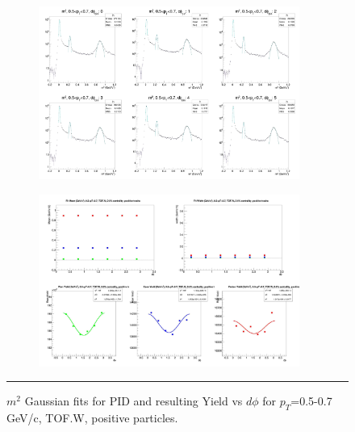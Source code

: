 \begin{figure}[H]
  \centering
    \begin{subfigure}[p]{1\textwidth}
   \centering
   \includegraphics[width=0.94\textwidth]{lowptfits/yieldvsdphi_tof1_cent0_ch1_pT-5-7.jpg}
    \end{subfigure}
    \begin{subfigure}[p]{1\textwidth}
   \centering
   \includegraphics[width=0.94\textwidth]{lowptfits/fitParams_tof1_cent0_ch1_pT-5-7.jpg}
    \end{subfigure}
    \rule{35em}{0.5pt}
  \caption[PID fits and Yield vs $d\phi$ for $p_T$=0.5-0.7 GeV/c, TOF.W, positive particles. ]{$m^2$ Gaussian fits for PID and resulting Yield vs $d\phi$ for $p_T$=0.5-0.7 GeV/c, TOF.W, positive particles.}
  \label{fig:fits5-7pos}
\end{figure}

